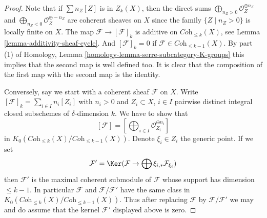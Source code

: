 \begin{proof}
Note that if $\sum n_Z[Z]$ is in $Z_k(X)$, then
the direct sums
$\bigoplus\nolimits_{n_Z > 0} \mathcal{O}_Z^{\oplus n_Z}$ and
$\bigoplus\nolimits_{n_Z < 0} \mathcal{O}_Z^{\oplus -n_Z}$
are coherent sheaves on $X$ since the family $\{Z \mid n_Z > 0\}$
is locally finite on $X$.
The map $\mathcal{F} \to [\mathcal{F}]_k$ is additive
on $\textit{Coh}_{\leq k}(X)$, see
Lemma \ref{lemma-additivity-sheaf-cycle}. And $[\mathcal{F}]_k = 0$
if $\mathcal{F} \in \textit{Coh}_{\leq k - 1}(X)$. By part (1)
of Homology, Lemma \ref{homology-lemma-serre-subcategory-K-groups}
this implies that the second map is well defined too.
It is clear that the composition of the first map with the second
map is the identity.

\medskip\noindent
Conversely, say we start with a coherent sheaf $\mathcal{F}$
on $X$. Write $[\mathcal{F}]_k = \sum_{i \in I} n_i[Z_i]$
with $n_i > 0$ and $Z_i \subset X$, $i \in I$
pairwise distinct integral closed subschemes of $\delta$-dimension $k$.
We have to show that
$$
[\mathcal{F}] = [\bigoplus\nolimits_{i \in I} \mathcal{O}_{Z_i}^{\oplus n_i}]
$$
in $K_0(\textit{Coh}_{\leq k}(X)/\textit{Coh}_{\leq k - 1}(X))$.
Denote $\xi_i \in Z_i$ the generic point.
If we set
$$
\mathcal{F}' = \Ker(\mathcal{F} \to \bigoplus \xi_{i, *}\mathcal{F}_{\xi_i})
$$
then $\mathcal{F}'$ is the maximal coherent submodule of $\mathcal{F}$
whose support has dimension $\leq k - 1$. In particular $\mathcal{F}$
and $\mathcal{F}/\mathcal{F}'$ have the same class in
$K_0(\textit{Coh}_{\leq k}(X)/\textit{Coh}_{\leq k - 1}(X))$.
Thus after replacing $\mathcal{F}$ by $\mathcal{F}/\mathcal{F}'$
we may and do assume that the kernel $\mathcal{F}'$ displayed
above is zero.


\end{proof}
